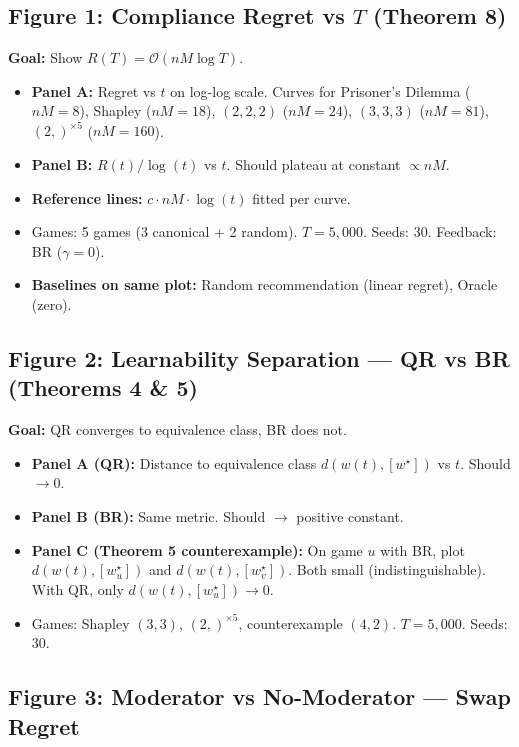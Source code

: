 \documentclass[11pt]{article}
\newcommand{\bigO}{\mathcal{O}}
\begin{document}
\subsection{Figure 1: Compliance Regret vs $T$ (Theorem 8)}

\textbf{Goal:} Show $R(T) = \bigO(nM \log T)$.

\begin{itemize}[nosep]
    \item \textbf{Panel A:} Regret vs $t$ on log-log scale. Curves for Prisoner's Dilemma ($nM{=}8$), Shapley ($nM{=}18$), $(2,2,2)$ ($nM{=}24$), $(3,3,3)$ ($nM{=}81$), $(2,)^{\times 5}$ ($nM{=}160$).
    \item \textbf{Panel B:} $R(t) / \log(t)$ vs $t$. Should plateau at constant $\propto nM$.
    \item \textbf{Reference lines:} $c \cdot nM \cdot \log(t)$ fitted per curve.
    \item Games: 5 games (3 canonical + 2 random). $T = 5{,}000$. Seeds: 30. Feedback: BR ($\gamma{=}0$).
    \item \textbf{Baselines on same plot:} Random recommendation (linear regret), Oracle (zero).
\end{itemize}

\subsection{Figure 2: Learnability Separation --- QR vs BR (Theorems 4 \& 5)}

\textbf{Goal:} QR converges to equivalence class, BR does not.

\begin{itemize}[nosep]
    \item \textbf{Panel A (QR):} Distance to equivalence class $d(w(t), [w^\star])$ vs $t$. Should $\to 0$.
    \item \textbf{Panel B (BR):} Same metric. Should $\to$ positive constant.
    \item \textbf{Panel C (Theorem 5 counterexample):} On game $u$ with BR, plot $d(w(t), [w^\star_u])$ and $d(w(t), [w^\star_v])$. Both small (indistinguishable). With QR, only $d(w(t), [w^\star_u]) \to 0$.
    \item Games: Shapley $(3,3)$, $(2,)^{\times 5}$, counterexample $(4,2)$. $T = 5{,}000$. Seeds: 30.
\end{itemize}

\subsection{Figure 3: Moderator vs No-Moderator --- Swap Regret}
\end{document}
